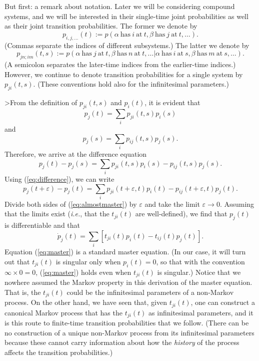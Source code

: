 \documentclass[12pt]{article}
\newcommand{\be}{\begin{equation}}
\newcommand{\ee}{\end{equation}}
\newcommand{\ie}{{\it i.e.}}         %
\newcommand{\ga}{\alpha}                                        %
\newcommand{\gb}{\beta}                                         %
\renewcommand{\epsilon}{\varepsilon}
\begin{document}
But first:  a remark about notation. Later we will be considering
compound systems, and we will be interested in their single-time joint
probabilities as well as their joint transition probabilities.  The
former we denote by
\[
p_{i,j,\ldots}(t) := p(\ga \ \mbox{has} \ i \
\mbox{at} \ t, \gb \ \mbox{has} \ j \ \mbox{at}\ t, \ldots ).
\]
(Commas separate the indices of different subsystems.)  The latter we
denote by
\[
p_{jn;im}(t,s) := p(\ga \ \mbox{has} \ j \
\mbox{at} \ t, \gb \ \mbox{has} \ n \ \mbox{at}\ t, \ldots \vert
\ga \ \mbox{has} \ i \ \mbox{at} \ s, \gb \ \mbox{has} \ m \ \mbox{at}\
s, \ldots).
\]
(A semicolon separates the later-time indices from the earlier-time
indices.)  However, we continue to denote transition probabilities
for a single system by $p_{ji}(t,s)$.  (These conventions hold also
for the infinitesimal parameters.)

>From the definition of $p_{ji}(t,s)$ and $p_{i}(t)$, it is evident
that
\be
p_{j}(t) = \sum_{i} p_{ji}(t,s) p_{i}(s)
\ee
and
\be
p_{j}(s) = \sum_{i} p_{ij}(t,s) p_{j}(s).
\ee
Therefore, we arrive at the difference equation
\be
\label{eq:difference}
p_{j}(t) - p_{j}(s) = \sum_{i}p_{ji}(t,s) p_{i}(s) - p_{ij}(t,s)
p_{j}(s).
\ee
Using (\ref{eq:difference}), we can write
\be
\label{eq:almostmaster}
p_{j}(t+\epsilon) - p_{j}(t) = \sum_{i}p_{ji}(t+\epsilon,t)
p_{i}(t) - p_{ij}(t+\epsilon,t) p_{j}(t).
\ee
Divide both sides of (\ref{eq:almostmaster}) by $\epsilon$ and take
the limit $\epsilon \rightarrow 0$.  Assuming that the limits exist
(\ie, that the $t_{ji}(t)$ are well-defined), we find that $p_{j}(t)$
is differentiable and that
\be
\label{eq:master}
\dot{p}_{j}(t) = \sum_{i} \left[ { t_{ji}(t) p_{i}(t) - t_{ij}(t)
p_{j}(t) } \right].
\ee
Equation (\ref{eq:master}) is a standard master equation.  (In our
case, it will turn out that $t_{ji}(t)$ is singular only when
$p_{i}(t) = 0$, so that with the convention $\infty \times 0 = 0$,
(\ref{eq:master}) holds even when $t_{ji}(t)$ is singular.) Notice
that we nowhere assumed the Markov property in this derivation of the
master equation.  That is, the $t_{ji}(t)$ could be the infinitesimal
parameters of a non-Markov process.  On the other hand, we have seen
that, given $t_{ji}(t)$, one can construct a canonical Markov process
that has the $t_{ji}(t)$ as infinitesimal parameters, and it is this
route to finite-time transition probabilities that we follow.  (There
can be no construction of a unique non-Markov process from its
infinitesimal parameters because these cannot carry information about
how the {\it history} of the process affects the transition
probabilities.)
\end{document}
